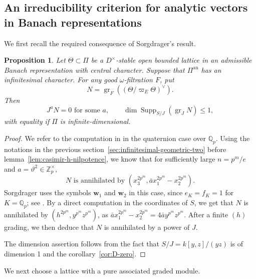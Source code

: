 \documentclass[11pt]{article}
\newtheorem{proposition}[theorem]{Proposition}
\theoremstyle{definition}
\newcommand{\gr}{\operatorname{gr}}
\newcommand{\Supp}{\operatorname{Supp}}
\begin{document}
\subsection{An irreducibility criterion for analytic vectors in Banach representations}
\label{sec:banach-criterion}
We first recall the required consequence of Sorgdrager's result.

\begin{proposition}\label{prop:sorgdrager-banach-support}
Let $\Theta\subset\Pi$ be a $D^\times$-stable open bounded lattice
in an admissible Banach representation with central character.
Suppose that $\Pi^{\mathrm{an}}$ has an infinitesimal character.
For any good $\omega$-filtration $F$, put
\[
 N=\gr_F((\Theta/\varpi_E\Theta)^\vee).
\]
Then
\[
 J^aN=0\text{ for some }a,\qquad
 \dim\Supp_{S/J}(\gr_JN)\leq1,
\]
with equality if $\Pi$ is infinite-dimensional.
\end{proposition}
\begin{proof}
We refer to the computation in \cite[\S6.6, Lemma~6.3; \S6.7, Theorem~6.2, equation (22)]{Sorgdrager2026} in the quaternion case over $\mathbb{Q}_p$. 
Using the notations in the previous section~\ref{sec:infinitesimal-geometric-two} before lemma~\ref{lem:casimir-h-nilpotence}, we know that for sufficiently large $n=p^m/e$ and $a=\vartheta^2\in\mathbb{Z}_p^\times$, 
\[N\text{ is annihilated by } (x_3^{2p^m}, \bar{a}x_1^{2p^m}-x_2^{2p^m}).\]
Sorgdrager uses the symbols $\mathbf w_1$ and $\mathbf{w}_2$ in this case, since $e_K=f_K=1$ for $K=\mathbb{Q}_p$; see \cite{Sorgdrager2026}.
By a direct computation in the coordinates of $S$, we get that $N$ is annihilated by $(h^{2p^m}, y^{p^m}z^{p^m})$, as $\bar{a}x_1^{2p^m}-x_2^{2p^m}=4\bar{a}y^{p^m}z^{p^m}$.
After a finite $(h)$ grading, we then deduce that $N$ is annihilated by a power of $J$. 

The dimension assertion follows from the fact that $S/J=k[y,z]/(yz)$ is of dimension 1 and the corollary~\ref{cor:D-zero}.
\end{proof}

We next choose a lattice with a pure associated graded module.
\end{document}
